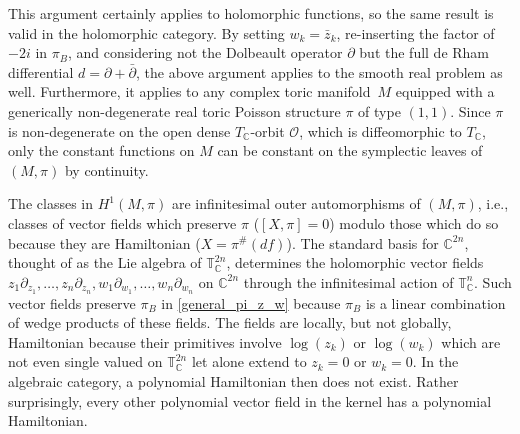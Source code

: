 \documentclass[pdftex]{sigma}
\numberwithin{equation}{section}
\begin{document}
This argument certainly applies to holomorphic functions, so the same result is valid in the holomorphic category. By setting $w_k=\bar{z}_k$, re-inserting the factor of $-2i$ in $\pi_B$, and considering not the Dolbeault operator $\partial$ but the full de Rham dif\/ferential $d=\partial+\bar{\partial}$, the above argument applies to the smooth real problem as well. Furthermore, it applies to any complex toric mani\-fold~$M$ equipped with a generically non-degenerate real toric Poisson structure $\pi$ of type $(1,1)$. Since $\pi$ is non-degenerate on the open dense $T_{\mathbb C}$-orbit $\mathcal O$, which is dif\/feomorphic to $T_{\mathbb C}$, only the constant functions on $M$ can be constant on the symplectic leaves of $(M,\pi)$ by continuity.

The classes in $H^1(M,\pi)$ are inf\/initesimal outer automorphisms of $(M,\pi)$, i.e., classes of vector f\/ields which preserve $\pi$ ($[X,\pi]=0$) modulo those which do so because they are Hamiltonian ($X=\pi^\#(df)$). The standard basis for ${\mathbb C}^{2n}$, thought of as the Lie algebra of ${\mathbb T}_{\mathbb C}^{2n}$, determines the holomorphic vector f\/ields $z_1\partial_{z_1},\dots,z_n\partial_{z_n},w_1\partial_{w_1},\dots,w_n\partial_{w_n}$ on ${\mathbb C}^{2n}$ through the inf\/initesimal action of $\mathbb T_{\mathbb C}^n$. Such vector f\/ields preserve $\pi_B$ in \eqref{general_pi_z_w} because $\pi_B$ is a linear combination of wedge products of these f\/ields. The f\/ields are locally, but not globally, Hamiltonian because their primitives involve $\log(z_k)$ or $\log(w_k)$ which are not even single valued on ${\mathbb T}_{\mathbb C}^{2n}$ let alone extend to $z_k=0$ or $w_k=0$. In the algebraic category, a polynomial Hamiltonian then does not exist. Rather surprisingly, every other polynomial vector f\/ield in the kernel has a polynomial Hamiltonian.
\end{document}

